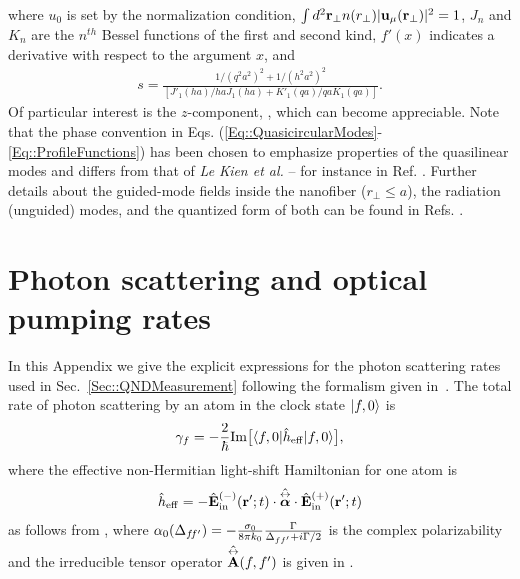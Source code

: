 where $u_0$ is set by the normalization condition, $\int d^2 \mathbf{r}_\perp n(r_\perp) | \mathbf{u}_\mu(\mathbf{r}_\perp)|^2=1$, $J_n$ and $K_n$ are the $n^{th}$ Bessel functions of the first and second kind, $f'(x)$ indicates a derivative with respect to the argument $x$, and 
	\begin{align}
		s = \frac{1/(q^2 a^2)^{2} + 1/(h^2 a^2)^{2}}{[J'_1(ha)/haJ_1(ha) + K'_1(qa)/qaK_1(qa)]}.
	\end{align}  
Of particular interest is the $z$-component, , which can become appreciable.  Note that the phase convention in Eqs. (\ref{Eq::QuasicircularModes}-\ref{Eq::ProfileFunctions}) has been chosen to emphasize properties of the quasilinear modes and differs from that of \emph{Le Kien et al.} -- for instance in Ref. \cite{le_kien_propagation_2014}.  
Further details about the guided-mode fields inside the nanofiber ($r_\perp\leq a$), the radiation (unguided) modes, and the quantized form of both can be found in Refs. \cite{sondergaard_general_2001, tong_single-mode_2004, kien_field_2004, le_kien_spontaneous_2005, vetsch_eugen_optical_2010}.


\section{Photon scattering and optical pumping rates} \label{Appendix::Rates}	

In this Appendix we give the explicit expressions for the photon scattering rates used in Sec.~\ref{Sec::QNDMeasurement} following the formalism given in~\cite{deutsch_quantum_2010}.  The total rate of photon scattering by an atom in the clock state $\lvert{f,0}\rangle$ is
	\begin{equation}\label{Eq::gammaf}
		\gamma_{f}=- \frac{2}{\hbar} {\rm Im} \big[ \bra{f,0} \hat{h}_{\rm eff}\ket{f,0} \big] ,
	\end{equation}
where the effective non-Hermitian light-shift Hamiltonian for one atom is 
\begin{align}
\hat{h}_{\rm eff} = - \hat{\mathbf{E}}^{(-)}_{\rm in}(\mathbf{r}' ; t ) \cdot \hat{\overset{\leftrightarrow}{\boldsymbol{\alpha}}} \cdot \hat{\mathbf{E}}^{(+)}_{\rm in}(\mathbf{r}' ;t )
\end{align}
as follows from , where $\alpha_0(\Delta_{f\!f'}) = -\frac{\sigma_0}{8\pi k_0}\frac{\Gamma}{\Delta_{ff'}+i\Gamma/2}$ is the complex polarizability and the irreducible tensor operator $ \hat{\overset{\leftrightarrow}{\mathbf{A}}}(f,f') $ is given in .


